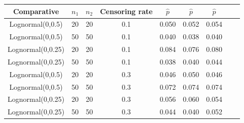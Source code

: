 \documentclass[11pt]{article}
\begin{document}
\begin{appendices}
\begin{table}[H]
{\begin{tabular}{ccccccccc}
								
								
								
								
								
								
								Comparative	& $n_1$ & $n_2$ & Censoring rate   & $\hat{p}$ & $\hat{p}$ & $\hat{p}$ & 	
								
								\\ 
								
								
								\hline 
								
								Lognormal(0,0.5) & 20 & 20 & 0.1 & 0.050 & 0.052 & 0.054  \\ 
								Lognormal(0,0.5) & 50 & 50 & 0.1 & 0.040  & 0.038 & 0.040   \\ 
								Lognormal(0,0.25) & 20 & 20 & 0.1 & 0.084  & 0.076 & 0.080  \\ 
								Lognormal(0,0.25) & 50 & 50 & 0.1 & 0.038 & 0.040 & 0.044   \\ 
								Lognormal(0,0.5) & 20 & 20 & 0.3 & 0.046  & 0.050 & 0.046  \\ 
								Lognormal(0,0.5) & 50 & 50 & 0.3 & 0.072 & 0.074 & 0.074   \\ 
								Lognormal(0,0.25) & 20 & 20 & 0.3 & 0.056 & 0.060 & 0.054   \\ 
								Lognormal(0,0.25) & 50 & 50 & 0.3 & 0.044 & 0.040 & 0.052  \\ 
								\hline
							\end{tabular}} 
							
							
							
							\label{fig:n11}	
							
						\end{table}
						
						
						
						
						
						







\begin{table}[H]
	\caption{	\label{append:tab:tabla6} Empirical mean and standart deviation of $p-values$ Exponential distribution under the null hyphotesis. }
	

\end{table}
\end{appendices}
\end{document}
